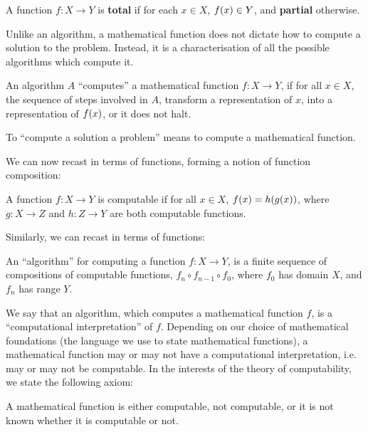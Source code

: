 \begin{definition} A function $f:X\rightarrow Y$ is \textbf{total} if for each
$x\in X$, $f\mathopen{}\left({x}\right)\mathclose{}\in Y$, and \textbf{partial} otherwise. \end{definition}

Unlike an algorithm, a mathematical function does not dictate how to compute a
solution to the problem. Instead, it is a characterisation of all the possible
algorithms which compute it.

\begin{notion}

An algorithm $A$ ``computes'' a mathematical function $f:X\rightarrow Y$, if
for all $x\in X$, the sequence of steps involved in $A$, transform a
representation of $x$, into a representation of $f\mathopen{}\left({x}\right)\mathclose{}$, or it does not halt.

\end{notion}

\begin{notion} To ``compute a solution a problem'' means to compute a
mathematical function.  \end{notion}

We can now recast  in terms of functions,
forming a notion of function composition:

\begin{hypothesis} A function $f:X\rightarrow Y$ is computable if for all $x\in
X$, $f\mathopen{}\left({x}\right)\mathclose{}=h\mathopen{}\left({g\mathopen{}\left({x}\right)\mathclose{}}\right)\mathclose{}$, where $g:X\rightarrow Z$ and $h:Z\rightarrow Y$ are
both computable functions. \end{hypothesis}

Similarly, we can recast  in terms of functions:

\begin{notion} An ``algorithm'' for computing a function $f:X\rightarrow Y$, is
a finite sequence of compositions of computable functions, $f_n \circ f_{n-1}
\circ f_0$, where $f_0$ has domain $X$, and $f_n$ has range $Y$. \end{notion}

We say that an algorithm, which computes a mathematical function $f$, is a
``computational interpretation'' of $f$. Depending on our choice of
mathematical foundations (the language we use to state mathematical functions),
a mathematical function may or may not have a computational interpretation,
i.e.  may or may not be computable. In the interests of the theory of
computability, we state the following axiom:

\begin{textaxiom} A mathematical function is either computable, not computable,
or it is not known whether it is computable or not. \end{textaxiom}

